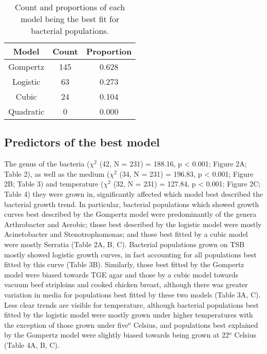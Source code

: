 \documentclass[11pt]{article}
\newcommand{\supersc}[1]{\ensuremath{^{\textrm{#1}}}}
\begin{document}
	\begin{table}[htbp] 
		\caption{Count and proportions of each model being the best fit for bacterial populations.}
		\centering      %
		\begin{tabular}{c c c}  %
			\hline                        %
			Model & Count & Proportion \\ [0.5ex] %
			\hline                    %
			Gompertz & 145 & 0.628  \\
			Logistic & 63 & 0.273 \\ 
			Cubic & 24 & 0.104 \\ 
			Quadratic & 0 & 0.000 \\ 
			 [0.5ex]
			\hline     %
		\end{tabular} 
		\label{table1}  %
	\end{table} 


	

	
	\subsection{Predictors of the best model}
	
	The genus of the bacteria ($\chi^2$ (42, N = 231) = 188.16, p < 0.001; Figure 2A; Table 2), as well as the medium ($\chi^2$ (34, N = 231) = 196.83, p < 0.001; Figure 2B; Table 3) and temperature ($\chi^2$ (32, N = 231) = 127.84, p < 0.001; Figure 2C; Table 4) they were grown in, significantly affected which model best described the bacterial growth trend. In particular, bacterial populations which showed growth curves best described by the Gompertz model were predominantly of the genera Arthrobacter and Aerobic; those best described by the logistic model were mostly Acinetobacter and Stenotrophomonas; and those best fitted by a cubic model were mostly Serratia (Table 2A, B, C). Bacterial populations grown on TSB mostly showed logistic growth curves, in fact accounting for all populations best fitted by this curve (Table 3B). Similarly, those best fitted by the Gompertz model were biased towards TGE agar and those by a cubic model towards vacuum beef striploins and cooked chicken breast, although there was greater variation in media for populations best fitted by these two models (Table 3A, C). Less clear trends are visible for temperature, although bacterial populations best fitted by the logistic model were mostly grown under higher temperatures with the exception of those grown under five\supersc{o} Celsius, and populations best explained by the Gompertz model were slightly biased towards being grown at 22\supersc{o} Celsius (Table 4A, B, C).
	
\end{document}
